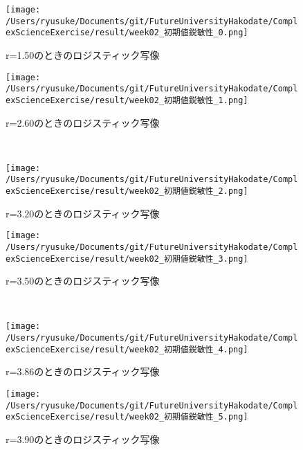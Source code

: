 \documentclass[dvipdfmx,uplatex]{jsarticle}
\begin{document}
\begin{figure}[htbp]
 \begin{minipage}{0.5\hsize}
  \begin{center}
   \texttt{[image: /Users/ryusuke/Documents/git/FutureUniversityHakodate/ComplexScienceExercise/result/week02\_初期値鋭敏性\_0.png]}
  \end{center}
  \caption{r=1.50のときのロジスティック写像}
  \label{fig:logistic_1}
 \end{minipage}
 \begin{minipage}{0.5\hsize}
  \begin{center}
   \texttt{[image: /Users/ryusuke/Documents/git/FutureUniversityHakodate/ComplexScienceExercise/result/week02\_初期値鋭敏性\_1.png]}
  \end{center}
  \caption{r=2.60のときのロジスティック写像}
  \label{fig:logistic_2}
 \end{minipage} \\
 \begin{minipage}{0.5\hsize}
  \begin{center}
   \texttt{[image: /Users/ryusuke/Documents/git/FutureUniversityHakodate/ComplexScienceExercise/result/week02\_初期値鋭敏性\_2.png]}
  \end{center}
  \caption{r=3.20のときのロジスティック写像}
  \label{fig:logistic_3}
 \end{minipage}
 \begin{minipage}{0.5\hsize}
  \begin{center}
   \texttt{[image: /Users/ryusuke/Documents/git/FutureUniversityHakodate/ComplexScienceExercise/result/week02\_初期値鋭敏性\_3.png]}
  \end{center}
  \caption{r=3.50のときのロジスティック写像}
  \label{fig:logistic_4}
 \end{minipage} \\
 \begin{minipage}{0.5\hsize}
  \begin{center}
   \texttt{[image: /Users/ryusuke/Documents/git/FutureUniversityHakodate/ComplexScienceExercise/result/week02\_初期値鋭敏性\_4.png]}
  \end{center}
  \caption{r=3.86のときのロジスティック写像}
  \label{fig:logistic_5}
 \end{minipage}
 \begin{minipage}{0.5\hsize}
  \begin{center}
   \texttt{[image: /Users/ryusuke/Documents/git/FutureUniversityHakodate/ComplexScienceExercise/result/week02\_初期値鋭敏性\_5.png]}
  \end{center}
  \caption{r=3.90のときのロジスティック写像}
  \label{fig:logistic_6}
 \end{minipage}
\end{figure}
\end{document}
